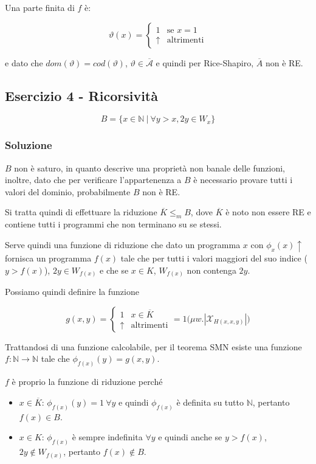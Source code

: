 Una parte finita di $f$ è:

$$
\vartheta(x) = \begin{cases}
1 &\text{se } x=1 \\
\uparrow &\text{altrimenti}
\end{cases}
$$

e dato che $dom(\vartheta) = cod(\vartheta)$, $\vartheta \in \overline{\mathcal{A}}$ e quindi per Rice-Shapiro, $\overline{A}$ non è RE.


\subsection{Esercizio 4 - Ricorsività  }

$$
B = \{ x \in \mathbb{N} \: | \: \forall y > x, 2y \in W_x \}
$$

\subsubsection{Soluzione}

$B$ non è saturo, in quanto descrive una proprietà non banale delle funzioni, inoltre, dato che per verificare l'appartenenza a $B$ è necessario provare tutti i valori del dominio, probabilmente $B$ non è RE.

Si tratta quindi di effettuare la riduzione $\overline{K} \leq_m B$, dove $\overline{K}$ è noto non essere RE e contiene tutti i programmi che non terminano su se stessi.

Serve quindi una funzione di riduzione che dato un programma $x$ con $\phi_x(x) \uparrow$ fornisca un programma $f(x)$ tale che per tutti i valori maggiori del suo indice ($y > f(x)$), $2y \in W_{f(x)}$ e che se $x \in K$, $W_{f(x)}$ non contenga $2y$.

Possiamo quindi definire la funzione

$$
g(x,y) = \begin{cases}
1 &x \in \overline{K} \\
\uparrow &\text{altrimenti}
\end{cases} = 1\bigg(\mu w. |\mathcal{X}_{H(x,x, y)}|\bigg)
$$

Trattandosi di una funzione calcolabile, per il teorema SMN esiste una funzione $f : \mathbb{N} \rightarrow \mathbb{N}$ tale che $\phi_{f(x)}(y) = g(x,y)$.

$f$ è proprio la funzione di riduzione perché

\begin{itemize}
	\item $x \in \overline{K}$: $\phi_{f(x)}(y) = 1 \: \forall y$ e quindi $\phi_{f(x)}$ è definita su tutto $\mathbb{N}$, pertanto $f(x) \in B$.
	\item $x \in K$: $\phi_{f(x)}$ è sempre indefinita $\forall y$ e quindi anche se $y > f(x)$, $2y \notin W_{f(x)}$, pertanto $f(x) \notin B$.
\end{itemize}

